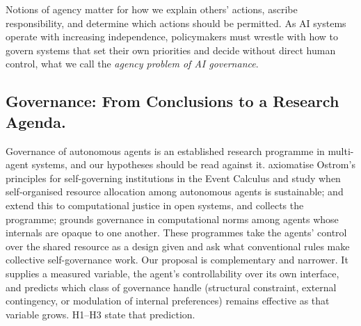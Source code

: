 \documentclass[letterpaper]{article} %
\theoremstyle{definition}
\begin{document}
Notions of agency matter for how we explain others' actions, ascribe responsibility, and determine which actions should be permitted. As AI systems operate with increasing independence, policymakers must wrestle with how to govern systems that set their own priorities and decide without direct human control, what we call the \emph{agency problem of AI governance}.

\subsection{Governance: From Conclusions to a Research Agenda.}

Governance of autonomous agents is an established research programme in multi-agent systems, and our hypotheses should be read against it. \citet{pittAxiomatizationSocioEconomic2012} axiomatise Ostrom's principles for self-governing institutions in the Event Calculus and study when self-organised resource allocation among autonomous agents is sustainable; \citet{pittComputationalJustice2015} and \citet{pittOpenAgentSociety2015} extend this to computational justice in open systems, and \citet{pittSelfOrganisingMAS2021} collects the programme; \citet{singhNormsGoverning2013} grounds governance in computational norms among agents whose internals are opaque to one another. These programmes take the agents' control over the shared resource as a design given and ask what conventional rules make collective self-governance work. Our proposal is complementary and narrower. It supplies a measured variable, the agent's controllability over its own interface, and predicts which class of governance handle (structural constraint, external contingency, or modulation of internal preferences) remains effective as that variable grows. H1--H3 state that prediction.
\end{document}
